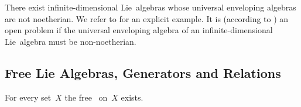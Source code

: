 \begin{remark}
	There exist infinite-dimensional Lie~algebras whose universal enveloping algebras are not noetherian.
	We refer to \cite{uea_of_witt_algebra_not_noetherian} for an explicit example.
	It is (according to \cite[p.\ xix]{introduction_to_noncommutative_noetherian}) an open problem if the universal enveloping algebra of an infinite-dimensional Lie~algebra must be non-noetherian.
\end{remark}



\subsection*{Free Lie Algebras, Generators and Relations}

\begin{proposition}
	\label{existence of free lie algebras}
	For every set~$X$ the free~{\liealgebra{$\kf$}} on~$X$ exists.
\end{proposition}


